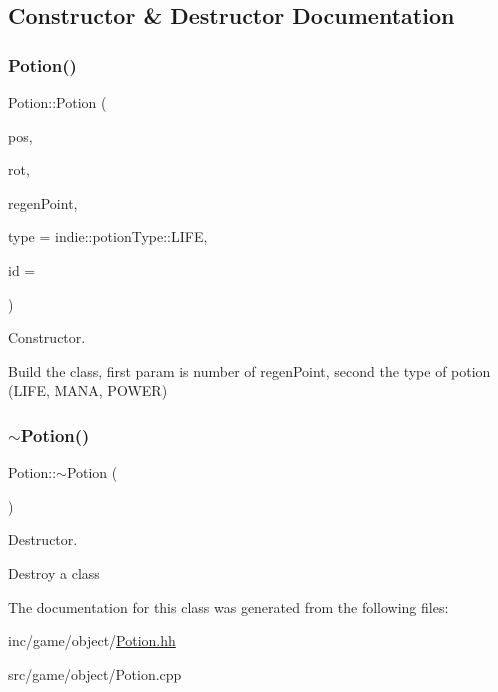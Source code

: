 \subsection{Constructor \& Destructor Documentation}
\mbox{\label{classPotion_aff0f8a0f2541246476e30be3eaed1351}} 
\subsubsection{\texorpdfstring{Potion()}{Potion()}}
{\footnotesize\ttfamily Potion\+::\+Potion (\begin{DoxyParamCaption}\item[{const Vector3d \&}]{pos,  }\item[{const Vector3d \&}]{rot,  }\item[{Int}]{regen\+Point,  }\item[{indie\+::potion\+Type}]{type = {\ttfamily indie\+:\+:potionType\+:\+:LIFE},  }\item[{Unsigned\+Int}]{id = {} }\end{DoxyParamCaption})}



Constructor. 

Build the class, first param is number of regen\+Point, second the type of potion (L\+I\+FE, M\+A\+NA, P\+O\+W\+ER) \mbox{\label{classPotion_a8730c8052ec698171885bb5dacda9cca}} 
\subsubsection{\texorpdfstring{$\sim$\+Potion()}{~Potion()}}
{\footnotesize\ttfamily Potion\+::$\sim$\+Potion (\begin{DoxyParamCaption}{ }\end{DoxyParamCaption})}



Destructor. 

Destroy a class 

The documentation for this class was generated from the following files\+:\begin{DoxyCompactItemize}
\item 
inc/game/object/\hyperlink{Potion_8hh}{Potion.\+hh}\item 
src/game/object/Potion.\+cpp\end{DoxyCompactItemize}

